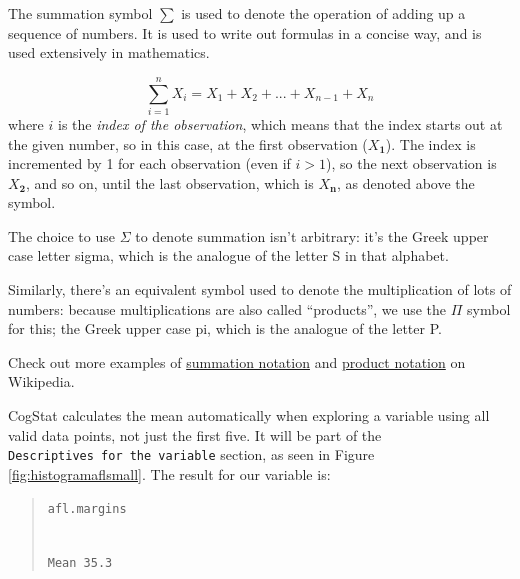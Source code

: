 \documentclass[
  11pt,
]{book}
\theoremstyle{definition}
\theoremstyle{definition}
\theoremstyle{definition}
\theoremstyle{definition}
\theoremstyle{remark}
\begin{document}
\hypertarget{summation}{}
\begin{callout}

The summation symbol \(\scriptstyle\sum\) is used to denote the operation of adding up a sequence of numbers. It is used to write out formulas in a concise way, and is used extensively in mathematics.

\[
\sum_{i=1}^n X_i = X_1 + X_2 + ... + X_{n-1} + X_n
\]
where \(i\) is the \emph{index of the observation}, which means that the index starts out at the given number, so in this case, at the first observation (\(X_\mathbf{1}\)). The index is incremented by 1 for each observation (even if \(i>1\)), so the next observation is \(X_\mathbf{2}\), and so on, until the last observation, which is \(X_\mathbf{n}\), as denoted above the symbol.

The choice to use \(\Sigma\) to denote summation isn't arbitrary: it's the Greek upper case letter sigma, which is the analogue of the letter S in that alphabet.

Similarly, there's an equivalent symbol used to denote the multiplication of lots of numbers: because multiplications are also called ``products'', we use the \(\Pi\) symbol for this; the Greek upper case pi, which is the analogue of the letter P.

Check out more examples of \href{https://en.wikipedia.org/wiki/Summation\#Capital-sigma_notation}{summation notation} and \href{https://en.wikipedia.org/wiki/Multiplication\#Product_of_a_sequence}{product notation} on Wikipedia.

\end{callout}

CogStat calculates the mean automatically when exploring a variable using all valid data points, not just the first five. It will be part of the \texttt{Descriptives\ for\ the\ variable} section, as seen in Figure \ref{fig:histogramaflsmall}. The result for our variable is:

\begin{quote}
\texttt{afl.margins}\strut \\
\texttt{Mean\ 35.3}
\end{quote}
\end{document}

